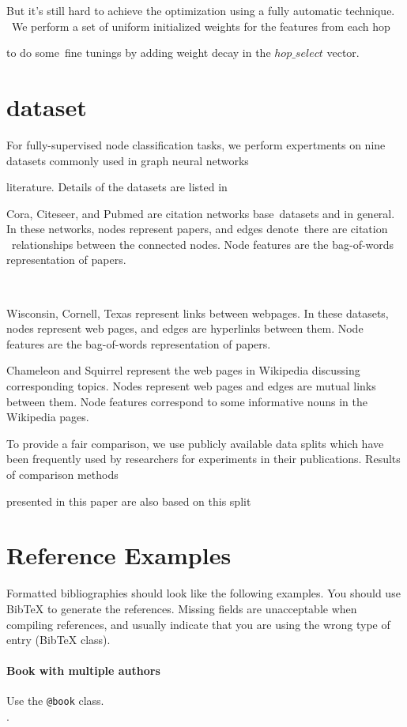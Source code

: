 \documentclass[letterpaper]{article} %
\begin{document}
But it's still hard to achieve the optimization using a fully automatic technique.  We perform a set of uniform initialized weights for the features from each hop%

to do some fine tunings by adding weight decay in the $hop\_select$ vector. 

\section{ dataset}
For fully-supervised node classification tasks, we perform expertments on nine datasets commonly used in graph neural networks

literature. Details of the datasets are listed in %

Cora, Citeseer, and Pubmed are citation networks base datasets and in general. In these networks, nodes represent papers, and edges denote there are citation  relationships between the connected nodes. Node features are the bag-of-words representation of papers.

 

Wisconsin, Cornell, Texas represent links between webpages. In these datasets, nodes represent web pages, and edges are hyperlinks between them. Node features are the bag-of-words representation of papers.

Chameleon and Squirrel represent the web pages in Wikipedia discussing corresponding topics. Nodes represent web pages and edges are mutual links between them. Node features correspond to some informative nouns in the Wikipedia pages.

To provide a fair comparison, we use publicly available data splits which have been frequently used by researchers for
experiments in their publications. Results of comparison methods

presented in this paper are also based on this split

\section{Reference Examples}
\label{sec:reference_examples}

\nobibliography*
Formatted bibliographies should look like the following examples. You should use BibTeX to generate the references. Missing fields are unacceptable when compiling references, and usually indicate that you are using the wrong type of entry (BibTeX class).

\paragraph{Book with multiple authors~\nocite{em:86}} Use the \texttt{@book} class.\\[.2em]
.
\end{document}
